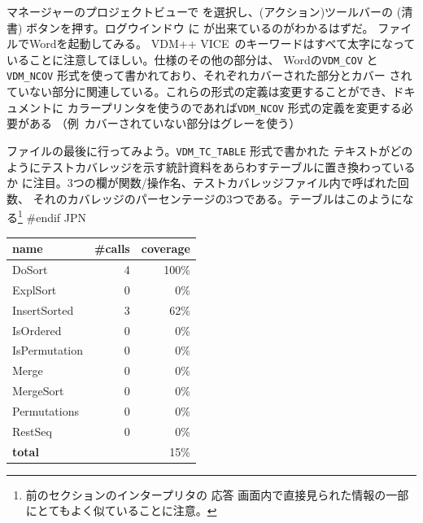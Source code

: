 \documentclass[\pformat,12pt]{article}
\newcommand{\vdmslpp}{VDM-SL}
\newcommand{\vdmslpp}{VDM++}
\renewcommand{\vdmslpp}{VDM++ VICE}
\newcommand{\guicmd}[1]{{\sf #1}}
\newcommand{\guicmd}[1]{{\gt #1}}
\begin{document}
\guicmd{マネージャー}の\guicmd{プロジェクトビュー}で
を選択し、(\guicmd{アクション})ツールバーの 
(\guicmd{清書}) ボタンを押す。\guicmd{ログウインドウ} に
が出来ているのがわかるはずだ。
ファイルでWordを起動してみる。
\vdmslpp\ のキーワードはすべて太字になっていることに注意してほしい。仕様のその他の部分は、
Wordの{\tt VDM\_COV}  と  {\tt VDM\_NCOV} 形式を使って書かれており、それぞれカバーされた部分とカバー
されていない部分に関連している。これらの形式の定義は変更することができ、ドキュメントに
カラープリンタを使うのであれば{\tt VDM\_NCOV} 形式の定義を変更する必要がある
（例\ カバーされていない部分はグレーを使う）

ファイルの最後に行ってみよう。{\tt VDM\_TC\_TABLE} 形式で書かれた
テキストがどのようにテストカバレッジを示す統計資料をあらわすテーブルに置き換わっているか
に注目。3つの欄が関数/操作名、テストカバレッジファイル内で呼ばれた回数、
それのカバレッジのパーセンテージの3つである。テーブルはこのようになる\footnote{前のセクションのインタープリタの
\guicmd{応答} 画面内で直接見られた情報の一部にとてもよく似ていることに注意。} 
#endif JPN

\begin{center}
\begin{tabular}{|l|r|r|}\hline
\textbf{name}   & \textbf{\#calls} & \textbf{coverage} \\ \hline
DoSort          & 4     & 100\% \\
ExplSort        & 0     & 0\%\\
InsertSorted    & 3     & 62\%\\
IsOrdered       & 0     & 0\%\\
IsPermutation   & 0     & 0\%\\
Merge           & 0     & 0\%\\
MergeSort       & 0     & 0\%\\
Permutations    & 0     & 0\%\\
RestSeq         & 0     & 0\%\\
\textbf{total}  &       & 15\%\\\hline
\end{tabular} 
\end{center}
\end{document}
